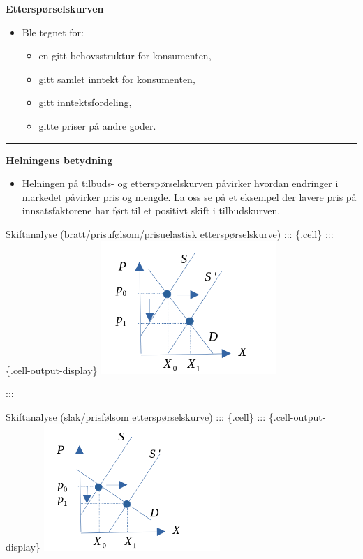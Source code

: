\documentclass[
  letterpaper,
  DIV=11,
  numbers=noendperiod]{scrartcl}
\providecommand{\tightlist}{%
  \setlength{\itemsep}{0pt}\setlength{\parskip}{0pt}}\usepackage{longtable,booktabs,array}
\begin{document}
\textbf{Etterspørselskurven}

\begin{itemize}
\tightlist
\item
  Ble tegnet for:

  \begin{itemize}
  \tightlist
  \item
    en gitt behovsstruktur for konsumenten,
  \item
    gitt samlet inntekt for konsumenten,
  \item
    gitt inntektsfordeling,
  \item
    gitte priser på andre goder.
  \end{itemize}
\end{itemize}

\begin{center}\rule{0.5\linewidth}{0.5pt}\end{center}

\textbf{Helningens betydning}

\begin{itemize}
\tightlist
\item
  Helningen på tilbuds- og etterspørselskurven påvirker hvordan
  endringer i markedet påvirker pris og mengde. La oss se på et eksempel
  der lavere pris på innsatsfaktorene har ført til et positivt skift i
  tilbudskurven.
\end{itemize}

Skiftanalyse (bratt/prisufølsom/prisuelastisk etterspørselskurve) :::
\{.cell\} ::: \{.cell-output-display\}
\includegraphics[width=0.5\textwidth,height=\textheight]{drawio/telikevekt_u.png}

:::

Skiftanalyse (slak/prisfølsom etterspørselskurve) ::: \{.cell\} :::
\{.cell-output-display\}
\includegraphics[width=0.5\textwidth,height=\textheight]{drawio/telikevekt_f.png}
\end{document}
